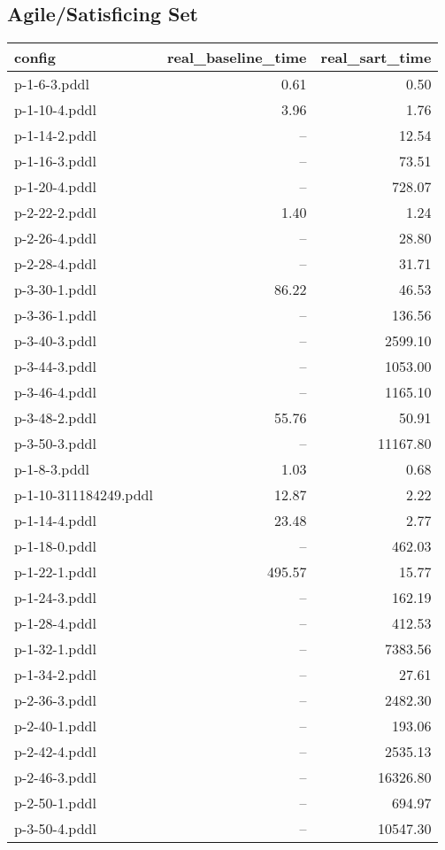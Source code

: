 \documentclass{article}
\begin{document}
                    \subsection*{Agile/Satisficing Set}
                    
                            \begin{center}
                            \scriptsize
                            \begin{tabular}{@{}l|r|r@{}}
                            config & real\_baseline\_time & real\_sart\_time\\\midrule
                             p-1-6-3.pddl&0.61&0.50\\
 p-1-10-4.pddl&3.96&1.76\\
 p-1-14-2.pddl&--&12.54\\
 p-1-16-3.pddl&--&73.51\\
 p-1-20-4.pddl&--&728.07\\
 p-2-22-2.pddl&1.40&1.24\\
 p-2-26-4.pddl&--&28.80\\
 p-2-28-4.pddl&--&31.71\\
 p-3-30-1.pddl&86.22&46.53\\
 p-3-36-1.pddl&--&136.56\\
 p-3-40-3.pddl&--&2599.10\\
 p-3-44-3.pddl&--&1053.00\\
 p-3-46-4.pddl&--&1165.10\\
 p-3-48-2.pddl&55.76&50.91\\
 p-3-50-3.pddl&--&11167.80\\
 p-1-8-3.pddl&1.03&0.68\\
 p-1-10-311184249.pddl&12.87&2.22\\
 p-1-14-4.pddl&23.48&2.77\\
 p-1-18-0.pddl&--&462.03\\
 p-1-22-1.pddl&495.57&15.77\\
 p-1-24-3.pddl&--&162.19\\
 p-1-28-4.pddl&--&412.53\\
 p-1-32-1.pddl&--&7383.56\\
 p-1-34-2.pddl&--&27.61\\
 p-2-36-3.pddl&--&2482.30\\
 p-2-40-1.pddl&--&193.06\\
 p-2-42-4.pddl&--&2535.13\\
 p-2-46-3.pddl&--&16326.80\\
 p-2-50-1.pddl&--&694.97\\
 p-3-50-4.pddl&--&10547.30
                            \end{tabular}
                            \end{center}
                    
\end{document}
